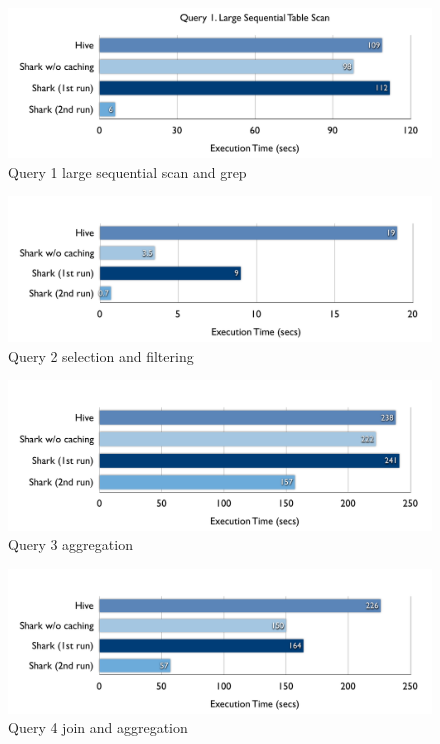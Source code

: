 \begin{figure}
	\centering
	\includegraphics[width=\linewidth]{files/query1.pdf}
	\caption{Query 1 large sequential scan and grep}
	\label{fig:query1}
\end{figure}

\begin{figure}
	\centering
	\includegraphics[width=\linewidth]{files/query2.pdf}
	\caption{Query 2 selection and filtering}
	\label{fig:query2}
\end{figure}

\begin{figure}
	\centering
	\includegraphics[width=\linewidth]{files/query3.pdf}
	\caption{Query 3 aggregation}
	\label{fig:query3}
\end{figure}

\begin{figure}
	\centering
	\includegraphics[width=\linewidth]{files/query4.pdf}
	\caption{Query 4 join and aggregation}
	\label{fig:query4}
\end{figure}


